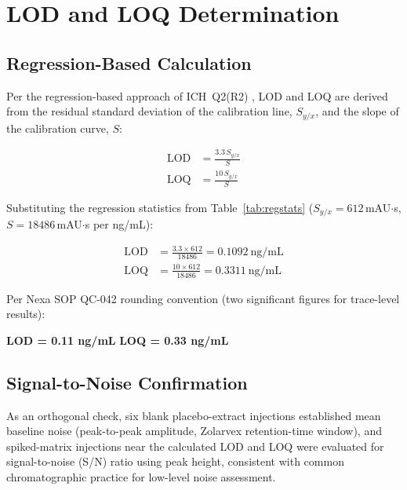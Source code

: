 
\section{LOD and LOQ Determination}

\subsection{Regression-Based Calculation}
Per the regression-based approach of ICH~Q2(R2) \citep{ich2023q2r2}, LOD and LOQ are
derived from the residual standard deviation of the calibration line, $S_{y/x}$, and
the slope of the calibration curve, $S$:

\begin{align}
\text{LOD} &= \frac{3.3 \, S_{y/x}}{S} \label{eq:lod}\\[4pt]
\text{LOQ} &= \frac{10 \, S_{y/x}}{S} \label{eq:loq}
\end{align}

Substituting the regression statistics from Table~\ref{tab:regstats}
($S_{y/x} = 612$\,mAU$\cdot$s, $S = 18486$\,mAU$\cdot$s per ng/mL):

\begin{align}
\text{LOD} &= \frac{3.3 \times 612}{18486} = 0.1092\ \text{ng/mL} \\
\text{LOQ} &= \frac{10 \times 612}{18486} = 0.3311\ \text{ng/mL}
\end{align}

Per Nexa SOP QC-042 rounding convention (two significant figures for trace-level
results):

\begin{tcolorbox}[resultbox, title={\faCheckCircle\ Reported Sensitivity}]
\centering
\textbf{LOD = 0.11 ng/mL} \hspace{2em} \textbf{LOQ = 0.33 ng/mL}
\end{tcolorbox}

\subsection{Signal-to-Noise Confirmation}
As an orthogonal check, six blank placebo-extract injections established mean
baseline noise (peak-to-peak amplitude, Zolarvex retention-time window), and
spiked-matrix injections near the calculated LOD and LOQ were evaluated for
signal-to-noise (S/N) ratio using peak height, consistent with common chromatographic
practice for low-level noise assessment.

